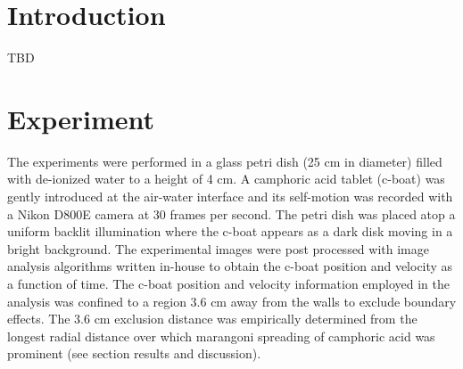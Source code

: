 \documentclass[journal=langd5, manuscript=article, layout=twocolumn]{achemso}
\begin{document}

\section{Introduction}
TBD

\section{Experiment}
The experiments were performed in a glass petri dish (25 cm in diameter) filled with de-ionized water to a height of 4 cm. A camphoric acid tablet (c-boat) was gently introduced at the air-water interface and its self-motion was recorded with a Nikon D800E camera at 30 frames per second. The petri dish was placed atop a uniform backlit illumination where the c-boat appears as a dark disk moving in a bright background. The experimental images were post processed with image analysis algorithms written in-house to obtain the c-boat position and velocity as a function of time. The c-boat position and velocity information employed in the analysis was confined to a region 3.6 cm away from the walls to exclude boundary effects. The 3.6 cm exclusion distance was empirically determined from the longest radial distance over which marangoni spreading of camphoric acid was prominent (see section results and discussion).
\end{document}
